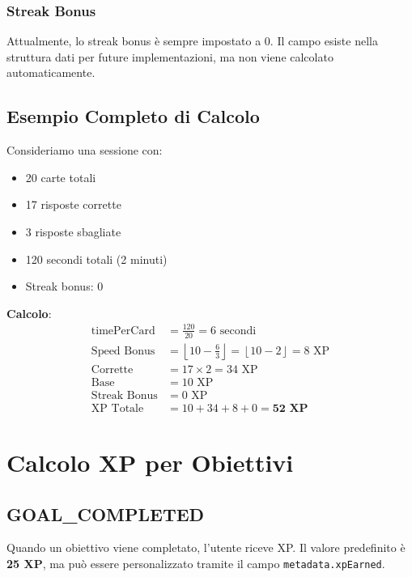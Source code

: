 \documentclass[11pt,a4paper]{article}
\begin{document}
\subsubsection{Streak Bonus}

Attualmente, lo streak bonus è sempre impostato a 0. Il campo esiste nella struttura dati per future implementazioni, ma non viene calcolato automaticamente.

\subsection{Esempio Completo di Calcolo}

Consideriamo una sessione con:
\begin{itemize}
    \item 20 carte totali
    \item 17 risposte corrette
    \item 3 risposte sbagliate
    \item 120 secondi totali (2 minuti)
    \item Streak bonus: 0
\end{itemize}

\textbf{Calcolo}:
\begin{align}
\text{timePerCard} &= \frac{120}{20} = 6 \text{ secondi} \\
\text{Speed Bonus} &= \left\lfloor 10 - \frac{6}{3} \right\rfloor = \left\lfloor 10 - 2 \right\rfloor = 8 \text{ XP} \\
\text{Corrette} &= 17 \times 2 = 34 \text{ XP} \\
\text{Base} &= 10 \text{ XP} \\
\text{Streak Bonus} &= 0 \text{ XP} \\
\text{XP Totale} &= 10 + 34 + 8 + 0 = \textbf{52 XP}
\end{align}

\section{Calcolo XP per Obiettivi}

\subsection{GOAL\_COMPLETED}

Quando un obiettivo viene completato, l'utente riceve XP. Il valore predefinito è \textbf{25 XP}, ma può essere personalizzato tramite il campo \texttt{metadata.xpEarned}.
\end{document}
